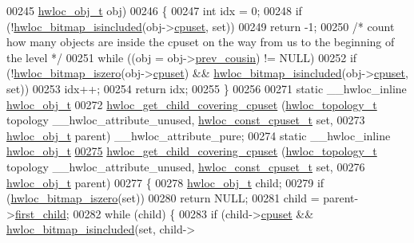 \begin{DoxyCode}
00245                                    \hyperlink{a00238}{hwloc\_obj\_t} obj)
00246 \{
00247   \textcolor{keywordtype}{int} idx = 0;
00248   \textcolor{keywordflow}{if} (!\hyperlink{a00205_ga0526e03db81956fb02acc8260b66d6a4}{hwloc\_bitmap\_isincluded}(obj->\hyperlink{a00238_a67925e0f2c47f50408fbdb9bddd0790f}{cpuset}, \textcolor{keyword}{set}))
00249     \textcolor{keywordflow}{return} -1;
00250   \textcolor{comment}{/* count how many objects are inside the cpuset on the way from us to the beginning of the level */}
00251   \textcolor{keywordflow}{while} ((obj = obj->\hyperlink{a00238_ac715989f55ff5a0eb6be2969ee477ec0}{prev\_cousin}) != NULL)
00252     \textcolor{keywordflow}{if} (!\hyperlink{a00205_ga5b64be28f5a7176ed8ad0d6a90bdf108}{hwloc\_bitmap\_iszero}(obj->\hyperlink{a00238_a67925e0f2c47f50408fbdb9bddd0790f}{cpuset}) && 
      \hyperlink{a00205_ga0526e03db81956fb02acc8260b66d6a4}{hwloc\_bitmap\_isincluded}(obj->\hyperlink{a00238_a67925e0f2c47f50408fbdb9bddd0790f}{cpuset}, \textcolor{keyword}{set}))
00253       idx++;
00254   \textcolor{keywordflow}{return} idx;
00255 \}
00256 
00271 \textcolor{keyword}{static} \_\_hwloc\_inline \hyperlink{a00238}{hwloc\_obj\_t}
00272 \hyperlink{a00196_ga0e66aa2dc6b2527cfd10723af646c9d7}{hwloc\_get\_child\_covering\_cpuset} (\hyperlink{a00186_ga9d1e76ee15a7dee158b786c30b6a6e38}{hwloc\_topology\_t} topology 
      \_\_hwloc\_attribute\_unused, \hyperlink{a00183_ga1f784433e9b606261f62d1134f6a3b25}{hwloc\_const\_cpuset\_t} \textcolor{keyword}{set},
00273                                 \hyperlink{a00238}{hwloc\_obj\_t} parent) \_\_hwloc\_attribute\_pure;
00274 \textcolor{keyword}{static} \_\_hwloc\_inline \hyperlink{a00238}{hwloc\_obj\_t}
\hyperlink{a00196_ga0e66aa2dc6b2527cfd10723af646c9d7}{00275} \hyperlink{a00196_ga0e66aa2dc6b2527cfd10723af646c9d7}{hwloc\_get\_child\_covering\_cpuset} (\hyperlink{a00186_ga9d1e76ee15a7dee158b786c30b6a6e38}{hwloc\_topology\_t} topology 
      \_\_hwloc\_attribute\_unused, \hyperlink{a00183_ga1f784433e9b606261f62d1134f6a3b25}{hwloc\_const\_cpuset\_t} \textcolor{keyword}{set},
00276                                 \hyperlink{a00238}{hwloc\_obj\_t} parent)
00277 \{
00278   \hyperlink{a00238}{hwloc\_obj\_t} child;
00279   \textcolor{keywordflow}{if} (\hyperlink{a00205_ga5b64be28f5a7176ed8ad0d6a90bdf108}{hwloc\_bitmap\_iszero}(\textcolor{keyword}{set}))
00280     \textcolor{keywordflow}{return} NULL;
00281   child = parent->\hyperlink{a00238_af51d08a0a79dba517c06c5afedc8d2dc}{first\_child};
00282   \textcolor{keywordflow}{while} (child) \{
00283     \textcolor{keywordflow}{if} (child->\hyperlink{a00238_a67925e0f2c47f50408fbdb9bddd0790f}{cpuset} && \hyperlink{a00205_ga0526e03db81956fb02acc8260b66d6a4}{hwloc\_bitmap\_isincluded}(\textcolor{keyword}{set}, child->

\end{DoxyCode}
